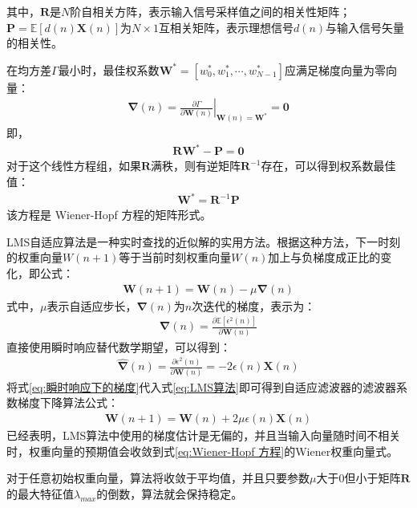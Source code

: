 \documentclass{ctexart}
\begin{document}
				其中，$\bm{R}$是$N$阶自相关方阵，表示输入信号采样值之间的相关性矩阵；$\bm{P}=\mathbb{E}[d(n)\bm{X}(n)]$为$N\times1$互相关矩阵，表示理想信号$d(n)$与输入信号矢量的相关性。\par
				在均方差$\Gamma$最小时，最佳权系数$\bm{W}^*=[w_0^*,w_1^*,\cdots, w_{N-1}^*]$应满足梯度向量为零向量：
				\begin{gather}
					\bm{\nabla}(n)=\left.\frac{\partial \Gamma}{\partial \bm{W}(n)}\right|_{\bm{W}(n)=\bm{W}^{*}}=\bm{0}
				\end{gather}
				即，
				\begin{gather}
					\bm{R}\bm{W}^*-\bm{P}=\bm{0}
				\end{gather}
				对于这个线性方程组，如果$\bm{R}$满秩，则有逆矩阵$\bm{R}^{-1}$存在，可以得到权系数最佳值：
				\begin{gather}
					\bm{W}^*=\bm{R}^{-1}\bm{P}
					\label{eq:Wiener-Hopf 方程}
				\end{gather}
				该方程是 Wiener-Hopf 方程的矩阵形式。\par
				LMS自适应算法是一种实时查找的近似解的实用方法。根据这种方法，下一时刻的权重向量$W(n+1)$等于当前时刻权重向量$W(n)$加上与负梯度成正比的变化，即公式：
				\begin{gather}
					\bm{W}(n+1)=\bm{W}(n)-\mu\bm{\nabla}(n)
					\label{eq:LMS算法}
				\end{gather}
				式中，$\mu$表示自适应步长，$\bm{\nabla}(n)$为$n$次迭代的梯度，表示为：
				\begin{gather}
					\bm{\nabla}(n)=\frac{\partial \mathbb{E}[\epsilon^2(n)]}{\partial \bm{W}(n)}
				\end{gather}
				直接使用瞬时响应替代数学期望，可以得到：
				\begin{gather}
					\bm{\hat{\nabla}}(n)=\frac{\partial \epsilon^2(n)}{\partial \bm{W}(n)}=-2\epsilon(n)\bm{X}(n)
					\label{eq:瞬时响应下的梯度}
				\end{gather}
				将式\ref{eq:瞬时响应下的梯度}代入式\ref{eq:LMS算法}即可得到自适应滤波器的滤波器系数梯度下降算法公式：
				\begin{gather}
					\bm{W}(n+1)=\bm{W}(n)+2\mu\epsilon(n)\bm{X}(n)
					\label{eq:自适应滤波器的滤波器系数梯度下降算法公式}
				\end{gather}
				已经表明，LMS算法中使用的梯度估计是无偏的，并且当输入向量随时间不相关时，权重向量的预期值会收敛到式\ref{eq:Wiener-Hopf 方程}的Wiener权重向量式。\par
				对于任意初始权重向量，算法将收敛于平均值，并且只要参数$\mu$大于0但小于矩阵$\bm{R}$的最大特征值$\lambda_{max}$的倒数，算法就会保持稳定。
\end{document}
